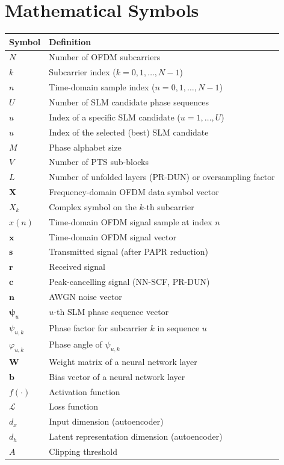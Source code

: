 \chapter*{Mathematical Symbols}
\label{ch:mathematical_symbols}

\begin{center}
\begin{tabular}{l l}
\toprule
    \textbf{Symbol} & \textbf{Definition} \\
\midrule
$N$ & Number of OFDM subcarriers \\
$k$ & Subcarrier index ($k = 0, 1, \dots, N-1$) \\
$n$ & Time-domain sample index ($n = 0, 1, \dots, N-1$) \\
$U$ & Number of SLM candidate phase sequences \\
$u$ & Index of a specific SLM candidate ($u = 1, \dots, U$) \\
$\hat{u}$ & Index of the selected (best) SLM candidate \\
$M$ & Phase alphabet size \\
$V$ & Number of PTS sub-blocks \\
$L$ & Number of unfolded layers (PR-DUN) or oversampling factor \\
$\bm{X}$ & Frequency-domain OFDM data symbol vector \\
$X_k$ & Complex symbol on the $k$-th subcarrier \\
$x(n)$ & Time-domain OFDM signal sample at index $n$ \\
$\bm{x}$ & Time-domain OFDM signal vector \\
$\bm{s}$ & Transmitted signal (after PAPR reduction) \\
$\bm{r}$ & Received signal \\
$\bm{c}$ & Peak-cancelling signal (NN-SCF, PR-DUN) \\
$\bm{n}$ & AWGN noise vector \\
$\bm{\psi}_u$ & $u$-th SLM phase sequence vector \\
$\psi_{u,k}$ & Phase factor for subcarrier $k$ in sequence $u$ \\
$\varphi_{u,k}$ & Phase angle of $\psi_{u,k}$ \\
$\bm{W}$ & Weight matrix of a neural network layer \\
$\bm{b}$ & Bias vector of a neural network layer \\
$f(\cdot)$ & Activation function \\
$\mathcal{L}$ & Loss function \\
$d_x$ & Input dimension (autoencoder) \\
$d_h$ & Latent representation dimension (autoencoder) \\
$A$ & Clipping threshold \\
\bottomrule
\end{tabular}


\end{center}
